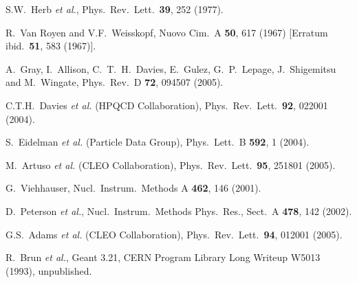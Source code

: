 \documentclass[aps,prd,preprint,superscriptaddress,tightenlines,nofootinbib]{revtex4}
\begin{document}
\begin{thebibliography}{99}

S.W.~Herb {\it et al.},
Phys.\ Rev.\ Lett.\  {\bf 39}, 252 (1977).

R.~Van Royen and V.F.~Weisskopf,
Nuovo Cim.\ A {\bf 50}, 617 (1967)
[Erratum ibid.\ {\bf 51}, 583 (1967)].

A.~Gray, I.~Allison, C.~T.~H.~Davies, E.~Gulez, G.~P.~Lepage, J.~Shigemitsu and M.~Wingate,
Phys.\ Rev.\ D {\bf 72}, 094507 (2005).

C.T.H.~Davies {\it et al.}  (HPQCD Collaboration),
Phys.\ Rev.\ Lett.\  {\bf 92}, 022001 (2004).

S.~Eidelman {\it et al.}  (Particle Data Group),
Phys.\ Lett.\ B {\bf 592}, 1 (2004).

M.~Artuso {\it et al.}  (CLEO Collaboration),
Phys.\ Rev.\ Lett.\ {\bf 95}, 251801 (2005).

G.~Viehhauser, Nucl.\ Instrum.\ Methods A {\bf 462}, 146 (2001).

D.~Peterson {\it et al.}, Nucl.\ Instrum.\ Methods Phys.\ Res., Sect.\ A {\bf 478}, 142 (2002).

G.S.~Adams {\it et al.}  (CLEO Collaboration),
Phys.\ Rev.\ Lett.\  {\bf 94}, 012001 (2005).

R.~Brun {\it et al.}, {\textsc Geant} 3.21, CERN Program Library Long
Writeup W5013 (1993), unpublished.


\end{thebibliography}
\end{document}
